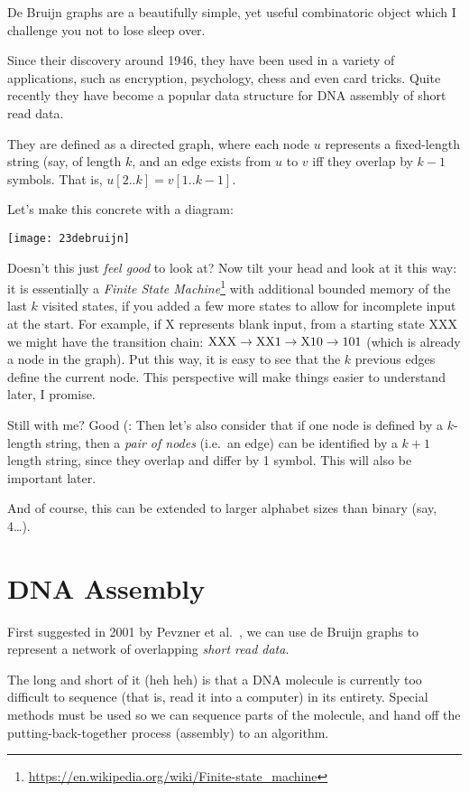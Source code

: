 De Bruijn graphs are a beautifully simple, yet useful combinatoric object which I challenge you not to lose sleep over.

Since their discovery around 1946, they have been used in a variety of applications, such as encryption, psychology, chess and even card tricks. Quite recently they have become a popular data structure for DNA assembly of short read data.

They are defined as a directed graph, where each node $u$ represents a fixed-length string (say, of length $k$, and an edge exists from $u$ to $v$ iff they overlap by $k-1$ symbols. That is, $u[2..k]=v[1..k-1]$.

Let's make this concrete with a diagram:

\medskip\centerline{\texttt{[image: 23debruijn]}}\medskip

Doesn't this just \emph{feel good} to look at? Now tilt your head and look at it this way: it is essentially a \emph{Finite State Machine}\footnote{\url{https://en.wikipedia.org/wiki/Finite-state_machine}} with additional bounded memory of the last $k$ visited states, if you added a few more states to allow for incomplete input at the start. For example, if X represents blank input, from a starting state XXX we might have the transition chain: $\rm XXX \to XX1 \to X10 \to 101$ (which is already a node in the graph). Put this way, it is easy to see that the $k$ previous edges define the current node. This perspective will make things easier to understand later, I promise.

Still with me? Good (: Then let's also consider that if one node is defined by a $k$-length string, then a \emph{pair of nodes} (i.e.\ an edge) can be identified by a $k+1$ length string, since they overlap and differ by 1 symbol. This will also be important later.

And of course, this can be extended to larger alphabet sizes than binary (say, 4\ldots).

\section{DNA Assembly}\label{bl-sec:dna}

First suggested in 2001 by Pevzner et al.~\cite{PevTan01}, we can use de Bruijn graphs to represent a network of overlapping \emph{short read data}.

The long and short of it (heh heh) is that a DNA molecule is currently too difficult to sequence (that is, read it into a computer) in its entirety. Special methods must be used so we can sequence parts of the molecule, and hand off the putting-back-together process (assembly) to an algorithm.

